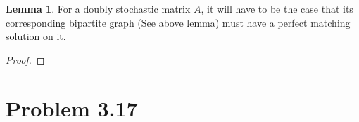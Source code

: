 \documentclass[]{article}
\theoremstyle{definition}
\newtheorem{lemma}{Lemma}[subsection]  %
\begin{document}
        \begin{lemma}
            For a doubly stochastic matrix $A$, it will have to be the case that its corresponding bipartite graph (See above lemma) must have a perfect matching solution on it.
        \end{lemma}
        \begin{proof}
            
        \end{proof}
\section{Problem 3.17}
    
\end{document}
